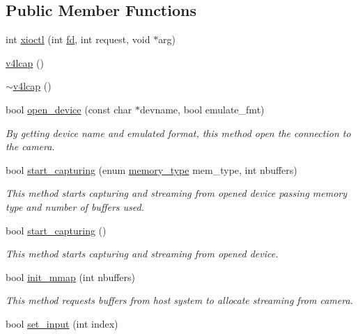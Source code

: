 \subsection*{Public Member Functions}
\begin{DoxyCompactItemize}
\item 
int \hyperlink{classv4lcap_ab5aaa5a8c0df17f5ca57e0b5170232cb}{xioctl} (int \hyperlink{classv4lcap_a38109593bde997dad13b3a461569573d}{fd}, int request, void $\ast$arg)
\item 
\hyperlink{classv4lcap_adacb93ad544708ef99c5cca4202e7c93}{v4lcap} ()
\item 
\hyperlink{classv4lcap_aa1aaea89befb94cdf3dbb24bf758078f}{$\sim$v4lcap} ()
\item 
bool \hyperlink{classv4lcap_a1404aae893a64a8e8859d822a4dfb273}{open\+\_\+device} (const char $\ast$devname, bool emulate\+\_\+fmt)
\begin{DoxyCompactList}\small\item\em By getting device name and emulated format, this method open the connection to the camera. \end{DoxyCompactList}\item 
bool \hyperlink{classv4lcap_a4a7ee51c878ec735c9a24b517c63df16}{start\+\_\+capturing} (enum \hyperlink{classv4lcap_aae799230441b7965d8947b104d8d753e}{memory\+\_\+type} mem\+\_\+type, int nbuffers)
\begin{DoxyCompactList}\small\item\em This method starts capturing and streaming from opened device passing memory type and number of buffers used. \end{DoxyCompactList}\item 
bool \hyperlink{classv4lcap_aa8b3b1ffead9a21abf2aea074d1b309b}{start\+\_\+capturing} ()
\begin{DoxyCompactList}\small\item\em This method starts capturing and streaming from opened device. \end{DoxyCompactList}\item 
bool \hyperlink{classv4lcap_a04f75c0a68f0e8547925906a488bb50d}{init\+\_\+mmap} (int nbuffers)
\begin{DoxyCompactList}\small\item\em This method requests buffers from host system to allocate streaming from camera. \end{DoxyCompactList}\item 
bool \hyperlink{classv4lcap_ab3496376778bd0acacacef396fcd6387}{set\+\_\+input} (int index)

\end{DoxyCompactItemize}
